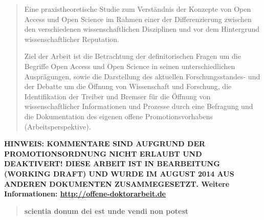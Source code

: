 
\begin{abstract}Eine praxistheoretische Studie zum Verständnis der Konzepte von Open Access und Open Science im Rahmen einer der Differenzierung zwischen den verschiedenen wissenschaftlichen Disziplinen und vor dem Hintergrund wissenschaftlicher Reputation.

Ziel der Arbeit ist die Betrachtung der definitorischen Fragen um die Begriffe Open Access und Open Science in seinen unterschiedlichen Ausprägungen, sowie die Darstellung des aktuellen Forschungsstandes- und der Debatte um die Öffnung von Wissenschaft und Forschung, die Identifikation der Treiber und Bremser für die Öffnung von wissenschaftlicher Informationen und Prozesse durch eine Befragung und die Dokumentation des eigenen offene Promotionsvorhabens (Arbeitsperspektive).
\end{abstract}

\textbf{HINWEIS: KOMMENTARE SIND AUFGRUND DER PROMOTIONSORDNUNG NICHT ERLAUBT UND DEAKTIVERT! DIESE ARBEIT IST IN BEARBEITUNG (WORKING DRAFT) UND WURDE IM AUGUST 2014 AUS ANDEREN DOKUMENTEN ZUSAMMEGESETZT.  Weitere Informationen: \href{http://offene-doktorarbeit.de}{http://offene-doktorarbeit.de}}

\begin{quote}
\textbf{scientia donum dei est unde vendi non potest}
\end{quote}
